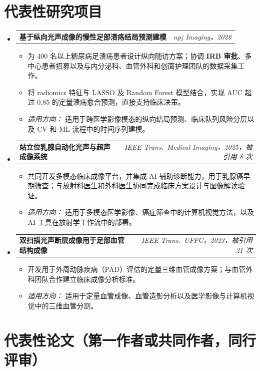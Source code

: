 \documentclass[letterpaper,10pt]{article}
\makeatletter
\newcommand{\projheading}[2]{
  \vspace{1pt}\item
  \begin{tabular*}{0.97\textwidth}[t]{l@{\extracolsep{\fill}}r}
    \textbf{#1} & \textit{\small#2} \\
  \end{tabular*}\vspace{2pt}
}
\newcommand{\projItemListStart}{\begin{itemize}[leftmargin=0.2in, topsep=3pt]}
\newcommand{\projItemListEnd}{\end{itemize}\vspace{2pt}}
\makeatother
\begin{document}
\vspace{-2pt}

\section{代表性研究项目}

\begin{itemize}[leftmargin=0in, label={}]

  \projheading{基于纵向光声成像的慢性足部溃疡结局预测建模}{npj Imaging，2026}
  \projItemListStart
    \item 为 400 名以上糖尿病足溃疡患者设计纵向随访方案；协调 \textbf{IRB 审批}、多中心患者招募以及与内分泌科、血管外科和创面护理团队的数据采集工作。
    \item 将 radiomics 特征与 LASSO 及 Random Forest 模型结合，实现 AUC 超过 0.85 的定量溃疡愈合预测，直接支持临床决策。
    \item \textit{适用方向：} 适用于跨医学影像模态的纵向结局预测、临床队列风险分层以及 CV 和 ML 流程中的时间序列建模。
  \projItemListEnd

  \projheading{站立位乳腺自动化光声与超声成像系统}{IEEE Trans.\ Medical Imaging，2025，被引用 8 次}
  \projItemListStart
    \item 共同开发多模态临床成像平台，并集成 AI 辅助诊断能力，用于乳腺癌早期筛查；与放射科医生和外科医生协同完成临床方案设计与图像解读验证。
    \item \textit{适用方向：} 适用于多模态医学影像、癌症筛查中的计算机视觉方法，以及 AI 工具在放射学工作流中的部署。
  \projItemListEnd

  \projheading{双扫描光声断层成像用于足部血管结构成像}{IEEE Trans.\ UFFC，2023，被引用 21 次}
  \projItemListStart
    \item 开发用于外周动脉疾病（PAD）评估的定量三维血管成像方案；与血管外科团队合作建立临床成像分析标准。
    \item \textit{适用方向：} 适用于定量血管成像、血管造影分析以及医学影像与计算机视觉中的三维血管分割。
  \projItemListEnd

\end{itemize}

\vspace{-2pt}

\section{代表性论文（第一作者或共同作者，同行评审）}
\end{document}
